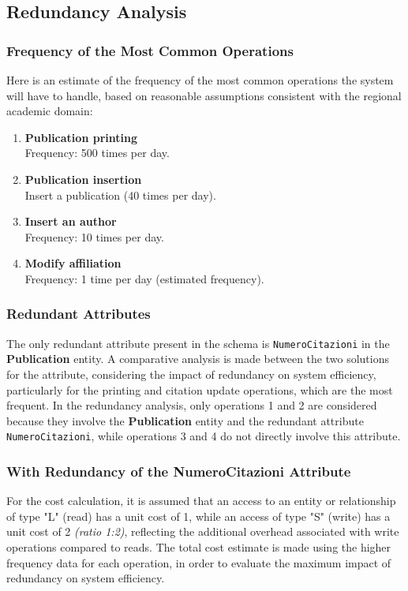 \documentclass[a4paper,12pt]{article}
\begin{document}
\subsection{Redundancy Analysis} \label{subsec:analisi-ridondanze}
\subsubsection*{Frequency of the Most Common Operations}
Here is an estimate of the frequency of the most common operations the system will have to handle, based on reasonable assumptions consistent with the regional academic domain:
\begin{enumerate}[label=\textbf{OP\arabic*}, start=1, leftmargin=1.5cm]
    \item \textbf{Publication printing} \\
    Frequency: 500 times per day.
    
    \item \textbf{Publication insertion} \\
    Insert a publication (40 times per day). \\
    \item \textbf{Insert an author} \\
    Frequency: 10 times per day.
    \item \textbf{Modify affiliation} \\
    Frequency: 1 time per day (estimated frequency).
\end{enumerate}
\subsubsection{Redundant Attributes}
The only redundant attribute present in the schema is \texttt{NumeroCitazioni} in the \textbf{Publication} entity. A comparative analysis is made between the two solutions for the attribute, considering the impact of redundancy on system efficiency, particularly for the printing and citation update operations, which are the most frequent. In the redundancy analysis, only operations 1 and 2 are considered because they involve the \textbf{Publication} entity and the redundant attribute \texttt{NumeroCitazioni}, while operations 3 and 4 do not directly involve this attribute.
\subsubsection{With Redundancy of the NumeroCitazioni Attribute} 
For the cost calculation, it is assumed that an access to an entity or relationship of type "L" (read) has a unit cost of 1, while an access of type "S" (write) has a unit cost of 2 \textit{(ratio 1:2)}, reflecting the additional overhead associated with write operations compared to reads. 
The total cost estimate is made using the higher frequency data for each operation, in order to evaluate the maximum impact of redundancy on system efficiency.
\end{document}
